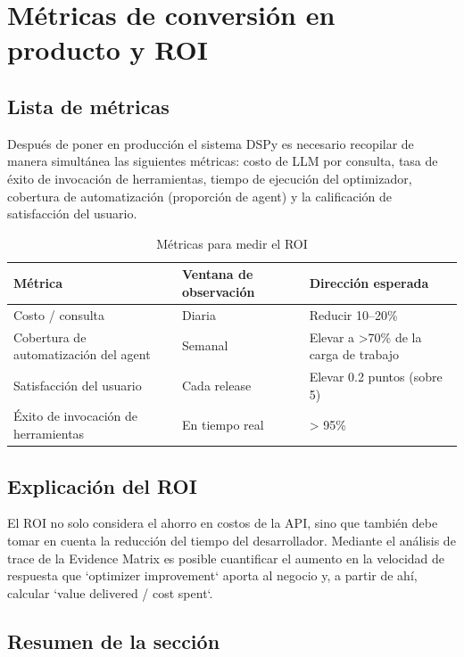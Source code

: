 \documentclass[a4paper]{article}
\begin{document}
\section{Métricas de conversión en producto y ROI}

\subsection{Lista de métricas}

Después de poner en producción el sistema DSPy es necesario recopilar de manera simultánea las siguientes métricas: costo de LLM por consulta, tasa de éxito de invocación de herramientas, tiempo de ejecución del optimizador, cobertura de automatización (proporción de agent) y la calificación de satisfacción del usuario.

\begin{table}[H]
\centering
\caption{Métricas para medir el ROI}
\begin{tabular}{p{}p{}p{}}
\toprule
Métrica & Ventana de observación & Dirección esperada \\
\midrule
Costo / consulta & Diaria & Reducir 10--20\% \\
Cobertura de automatización del agent & Semanal & Elevar a >70\% de la carga de trabajo \\
Satisfacción del usuario & Cada release & Elevar 0.2 puntos (sobre 5) \\
Éxito de invocación de herramientas & En tiempo real & > 95\% \\
\bottomrule
\end{tabular}
\end{table}

\subsection{Explicación del ROI}

El ROI no solo considera el ahorro en costos de la API, sino que también debe tomar en cuenta la reducción del tiempo del desarrollador. Mediante el análisis de trace de la Evidence Matrix es posible cuantificar el aumento en la velocidad de respuesta que `optimizer improvement` aporta al negocio y, a partir de ahí, calcular `value delivered / cost spent`.

\subsection{Resumen de la sección}
\end{document}
